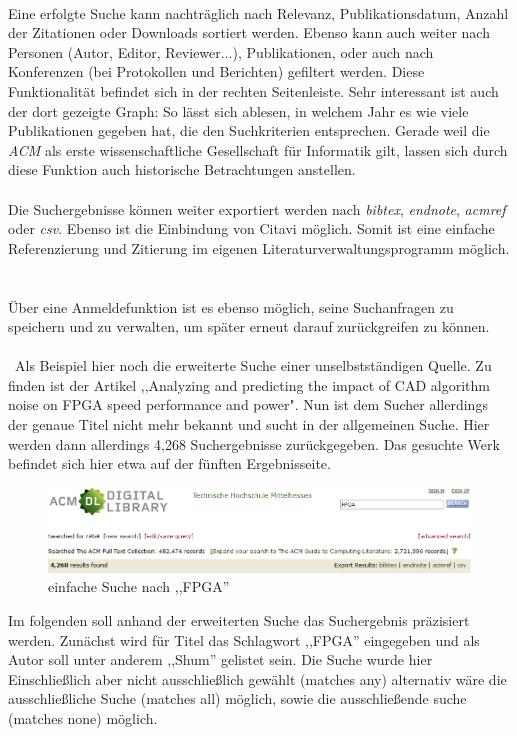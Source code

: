 \documentclass[
	ngerman,
	parskip=half,
	headsepline,
	fontsize=12pt,
	DIV=13,
	listof=leveldown,
	]{scrreprt}
\begin{document}
		\ \\
		Eine erfolgte Suche kann nachträglich nach Relevanz, Publikationsdatum, Anzahl der Zitationen oder Downloads sortiert werden. Ebenso kann auch weiter nach Personen (Autor, Editor, Reviewer...), Publikationen, oder auch nach Konferenzen (bei Protokollen und Berichten) gefiltert werden. Diese Funktionalität befindet sich in der rechten Seitenleiste. Sehr interessant ist auch der dort gezeigte Graph: So lässt sich ablesen, in welchem Jahr es wie viele Publikationen gegeben hat, die den Suchkriterien entsprechen. Gerade weil die \textit{ACM} als erste wissenschaftliche Gesellschaft für Informatik gilt, lassen sich durch diese Funktion auch historische Betrachtungen anstellen.
		\ \\
		\ \\
		Die Suchergebnisse können weiter exportiert werden nach \textit{bibtex}, \textit{endnote}, \textit{acmref} oder \textit{csv}. Ebenso ist die Einbindung von Citavi möglich. Somit ist eine einfache Referenzierung und Zitierung im eigenen Literaturverwaltungsprogramm möglich.
		\ \\
		\ \\
		Über eine Anmeldefunktion ist es ebenso möglich, seine Suchanfragen zu speichern und zu verwalten, um später erneut darauf zurückgreifen zu können.	
\\\
\\\
Als Beispiel hier noch die erweiterte Suche einer unselbstständigen Quelle. Zu finden ist der Artikel ,,Analyzing and predicting the impact of CAD algorithm noise on FPGA speed performance and power". Nun ist dem Sucher allerdings der genaue Titel nicht mehr bekannt und sucht in der allgemeinen Suche. Hier werden dann allerdings 4,268 Suchergebnisse zurückgegeben. Das gesuchte Werk befindet sich hier etwa auf der fünften Ergebnisseite. 
\begin{figure}[ht]
\centering
\includegraphics[width=\textwidth]{img/Suche_FPGA.PNG}
\caption{einfache Suche nach ,,FPGA''}
\end{figure}
Im folgenden soll anhand der erweiterten Suche das Suchergebnis präzisiert werden. Zunächst wird für Titel das Schlagwort ,,FPGA'' eingegeben und als Autor soll unter anderem ,,Shum'' gelistet sein.
Die Suche wurde hier Einschließlich aber nicht ausschließlich gewählt (matches any) alternativ wäre die ausschließliche Suche (matches all) möglich, sowie die ausschließende suche (matches none) möglich.
\end{document}
